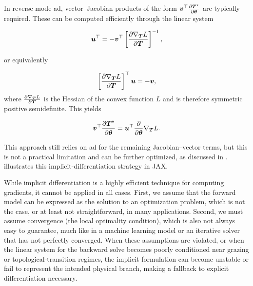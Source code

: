 In reverse-mode \gls{ad}, vector--Jacobian products of the form $\boldsymbol{v}^\top \frac{\partial \boldsymbol{T}^\star}{\partial \boldsymbol{\theta}}$ are typically required. These can be computed efficiently through the linear system

\begin{equation}
  \boldsymbol{u}^\top = -\boldsymbol{v}^\top \left[\frac{\partial \nabla_{\boldsymbol{T}} L}{\partial \boldsymbol{T}}\right]^{-1},
\end{equation}

or equivalently

\begin{equation}
  \left[\frac{\partial \nabla_{\boldsymbol{T}} L}{\partial \boldsymbol{T}}\right]^\top\boldsymbol{u} = -\boldsymbol{v},
\end{equation}
where $\frac{\partial \nabla_{\boldsymbol{T}} L}{\partial \boldsymbol{T}}$ is the Hessian of the convex function $L$ and is therefore symmetric positive semidefinite. This yields

\begin{equation}
  \boldsymbol{v}^\top \frac{\partial \boldsymbol{T}^\star}{\partial \boldsymbol{\theta}} = \boldsymbol{u}^\top \frac{\partial}{\partial \boldsymbol{\theta}} \nabla_{\boldsymbol{T}} L.
\end{equation}

This approach still relies on \gls{ad} for the remaining Jacobian--vector terms, but this is not a practical limitation and can be further optimized, as discussed in .  illustrates this implicit-differentiation strategy in JAX.

While implicit differentiation is a highly efficient technique for computing gradients, it cannot be applied in all cases. First, we assume that the forward model can be expressed as the solution to an optimization problem, which is not the case, or at least not straightforward, in many applications. Second, we must assume convergence (the local optimality condition), which is also not always easy to guarantee, much like in a machine learning model or an iterative solver that has not perfectly converged. When these assumptions are violated, or when the linear system for the backward solve becomes poorly conditioned near grazing or topological-transition regimes, the implicit formulation can become unstable or fail to represent the intended physical branch, making a fallback to explicit differentiation necessary.

\begin{listing}
  \ContinuedFloat*
  \caption{Example of implicit differentiation for the Fermat-based path tracing method in its convex setting. The path length function \texttt{L} is defined as in \eqref{eq:fermat_param}, where $\bsit{\theta} = (\bsit{A}, \bsit{B})$, and the optimal path $\bsit{T}^\star$ is returned by the \texttt{f} function. Static parameters may include the number of iterations, convergence thresholds, or solver hyperparameters; however, they are assumed not to impact the final solution.}
  \inputminted[firstline=13,lastline=33]{python}{codes/jax-implicit-diff.py}
\end{listing}

